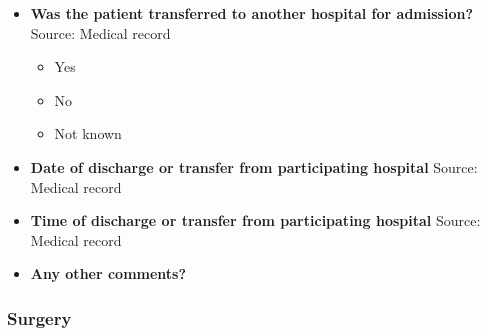 \documentclass[
]{scrartcl}
\providecommand{\tightlist}{%
  \setlength{\itemsep}{0pt}\setlength{\parskip}{0pt}}\usepackage{longtable,booktabs,array}
\begin{document}
\begin{itemize}
  \begin{itemize}
  \tightlist
  \item
    Alive
  \item
    Dead
  \item
    Transferred for admission
  \item
    Not known
  \end{itemize}
\item
  \textbf{Was the patient transferred to another hospital for
  admission?} Source: Medical record

  \begin{itemize}
  \tightlist
  \item
    Yes
  \item
    No
  \item
    Not known
  \end{itemize}
\item
  \textbf{Date of discharge or transfer from participating hospital}
  Source: Medical record
\item
  \textbf{Time of discharge or transfer from participating hospital}
  Source: Medical record
\item
  \textbf{Any other comments?}
\end{itemize}

\subsubsection{Surgery}\label{surgery}
\end{document}
